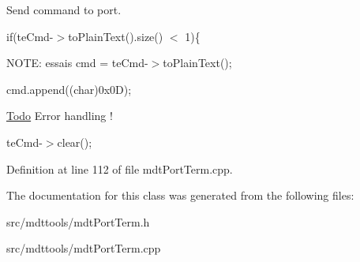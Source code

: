 Send command to port. 



if(teCmd-\/$>$toPlainText().size() $<$ 1)\{

NOTE: essais cmd = teCmd-\/$>$toPlainText();

cmd.append((char)0x0D);

\begin{Desc}
\item[\hyperlink{todo__todo000053}{Todo}]Error handling ! \end{Desc}


teCmd-\/$>$clear(); 



Definition at line 112 of file mdtPortTerm.cpp.



The documentation for this class was generated from the following files:\begin{DoxyCompactItemize}
\item 
src/mdttools/mdtPortTerm.h\item 
src/mdttools/mdtPortTerm.cpp\end{DoxyCompactItemize}
